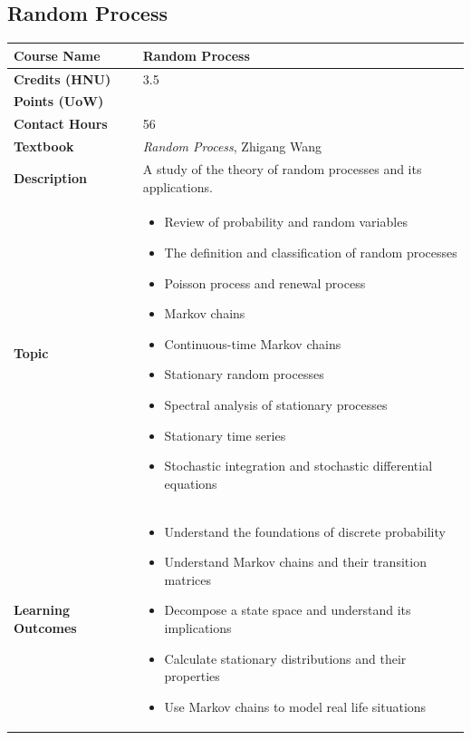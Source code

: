 \documentclass{article}
\begin{document}
\subsection{Random Process}
\renewcommand{\arraystretch}{1.5} %
\begin{longtable}{|p{3cm}|p{10cm}|}
\hline
\textbf{Course Name} & Random Process\\
\hline
\textbf{Credits (HNU)} & 3.5 \\
\hline
\textbf{Points (UoW)} & \\
\hline
\textbf{Contact Hours} & 56 \\
\hline
\textbf{Textbook} & \emph{Random Process}, Zhigang Wang\\
\hline
\textbf{Description} & A study of the theory of random processes and its applications. \\
\hline
\textbf{Topic} &  
\begin{itemize}
    \item Review of probability and random variables
    \item The definition and classification of random processes
    \item Poisson process and renewal process
    \item Markov chains
    \item Continuous-time Markov chains
    \item Stationary random processes
    \item Spectral analysis of stationary processes
    \item Stationary time series
    \item Stochastic integration and stochastic differential equations
\end{itemize}\\
\hline
\textbf{Learning Outcomes} & 
    \begin{itemize}
        \item Understand the foundations of discrete probability
        \item Understand Markov chains and their transition matrices
        \item Decompose a state space and understand its implications
        \item Calculate stationary distributions and their properties
        \item Use Markov chains to model real life situations
    \end{itemize} \\
\hline
\end{longtable}
\end{document}
